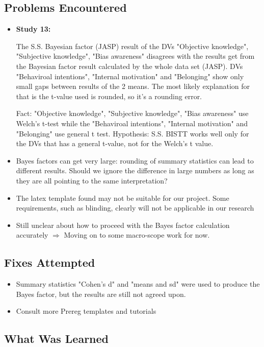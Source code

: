 \documentclass[11pt,a4paper]{article}
\begin{document}
\subsection{Problems Encountered}

\begin{itemize}
    \item \textbf{Study 13:}
    
    The S.S. Bayesian factor (JASP) result of the DVs "Objective knowledge", "Subjective knowledge", "Bias awareness" disagrees with the results get from the Bayesian factor result calculated by the whole data set (JASP).
DVs "Behaviroal intentions", "Internal motivation" and "Belonging" show only small gaps between results of the 2 means. The most likely explanation for that is the t-value used is rounded, so it's a rounding error.

Fact: "Objective knowledge", "Subjective knowledge", "Bias awareness" use Welch's t-test while the "Behaviroal intentions", "Internal motivation" and "Belonging" use general t test. 
Hypothesis: S.S. BISTT works well only for the DVs that has a general t-value, not for the Welch's t value.
    \item Bayes factors can get very large: rounding of summary statistics can lead to different results. Should we ignore the difference in large numbers as long as they are all pointing to the same interpretation?
    \item The latex template found may not be suitable for our project. Some requirements, such as blinding, clearly will not be applicable in our research
    \item Still unclear about how to proceed with the Bayes factor calculation accurately $\Rightarrow$ Moving on to some macro-scope work for now.
\end{itemize}

\subsection{Fixes Attempted}

\begin{itemize}
    \item Summary statistics "Cohen's d" and "means and sd" were used to produce the Bayes factor, but the results are still not agreed upon.
    \item Consult more Prereg templates and tutorials
\end{itemize}

\subsection{What Was Learned}
\end{document}
